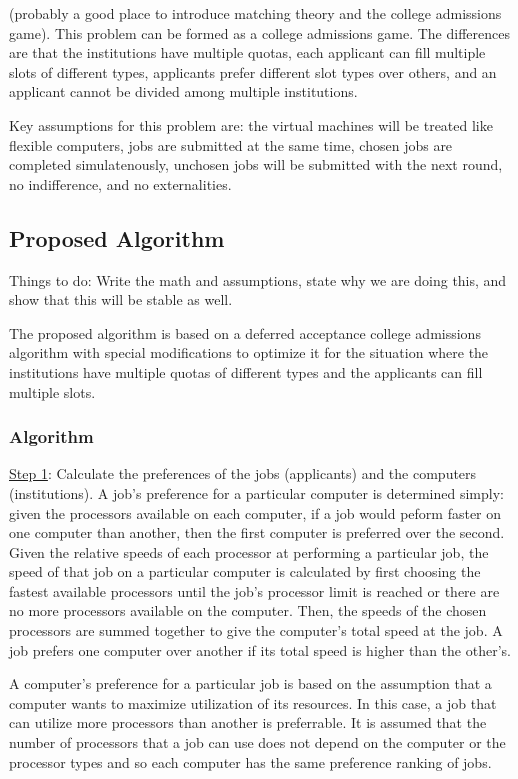 \documentclass[conference]{IEEEtran}
\begin{document}
(probably a good place to introduce matching theory
and the college admissions game).
This problem can be formed as a college admissions
game.  The differences are that the institutions
have multiple quotas, each applicant can fill multiple
slots of different types, applicants prefer different
slot types over others, and an applicant cannot be
divided among multiple institutions.

Key assumptions for this problem are:  the virtual machines
will be treated like flexible computers, jobs are submitted at
the same time, chosen jobs are completed simulatenously,
unchosen jobs will be submitted with the next round, no
indifference, and no externalities.

\subsection{Proposed Algorithm}
Things to do:  Write the math and assumptions, state why
we are doing this, and show that this will be stable as well.

The proposed algorithm is based on a deferred acceptance
college admissions algorithm with special modifications to optimize it for 
the situation where the institutions have multiple quotas of different
types and the applicants can fill multiple slots.

\subsubsection{Algorithm}
\underline{Step 1}: Calculate the preferences of the jobs (applicants) and the computers
(institutions).
A job's preference for a particular computer is determined simply:
given the processors available on each computer, if a job would peform 
faster on one computer than another, then the first computer is preferred over the second. 
Given the relative speeds of each processor at performing a particular job,
the speed of that job on a particular computer is calculated by first choosing the fastest
available processors until the job's processor limit is reached or there are no more
processors available on the computer.
Then, the speeds of the chosen processors are summed together to give 
the computer's total speed at the job.
A job prefers one computer over another if its total speed
is higher than the other's. 

A computer's preference for a particular job is based on the assumption
that a computer wants to maximize utilization of its resources. 
In this case, a job that can utilize more processors than another
is preferrable. It is assumed that the number of processors that a job can use 
does not depend on the computer or the processor types and so each computer
has the same preference ranking of jobs.
\end{document}
